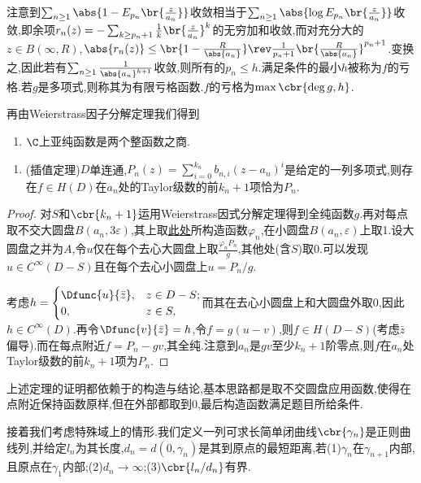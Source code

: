 \documentclass{article}
\begin{document}
注意到$\sum_{n\geq 1}\abs{1-E_{p_n}\br{\frac{z}{a_n}}}$收敛相当于$\sum_{n\geq 1}\abs{\log E_{p_n}\br{\frac{z}{a_n}}}$收敛,即余项$r_n(z)=-\sum_{k\geq p_n+1}\frac{1}{k}\br{\frac{z}{a_n}}^k$的无穷加和收敛,而对充分大的$z\in B(\infty,R)$,$\abs{r_n(z)}\leq \br{1-\frac{R}{\abs{a_n}}}\rev\frac{1}{p_n+1}\br{\frac{R}{\abs{a_n}}}^{p_n+1}$.变换之,因此若有$\sum_{n\geq 1}\frac{1}{\abs{a_n}^{h+1}}$收敛,则所有的$p_n\leq h$.满足条件的最小$h$被称为$f$的亏格.若$g$是多项式,则称其为有限亏格函数.$f$的亏格为$\max\cbr{\deg g,h}$.

再由Weierstrass因子分解定理我们得到
\begin{enumerate}[resume]
    \item $\C$上亚纯函数是两个整函数之商.\\
\end{enumerate}

\begin{enumerate}[resume]
    \item (插值定理)$D$单连通,$P_n(z)=\sum_{i=0}^{k_n}b_{n,i}(z-a_n)^i$是给定的一列多项式,则存在$f\in H(D)$在$a_n$处的Taylor级数的前$k_n+1$项恰为$P_n$.
\end{enumerate}
\begin{proof}
    对$S$和$\cbr{k_n+1}$运用Weierstrass因式分解定理得到全纯函数$g$.再对每点取不交大圆盘$B(a_n,3\varepsilon)$,其上取\hyperlink{dbar-func}{此处}所构造函数$\varphi_n$,在小圆盘$B(a_n,\varepsilon)$上取1.设大圆盘之并为$A$,令$u$仅在每个去心大圆盘上取$\frac{\varphi_n P_n}{g}$,其他处(含$S$)取0.可以发现$u\in C^\infty(D-S)$且在每个去心小圆盘上$u=P_n/g$.
    
    \dayhrule

    考虑$h=\begin{cases}
        \Dfunc{u}{\bar{z}},&z\in D-S;\\0,&z\in S,
    \end{cases}$而其在去心小圆盘上和大圆盘外取0,因此$h\in C^\infty(D)$.再令$\Dfunc{v}{\bar{z}}=h$,令$f=g(u-v)$,则$f\in H(D-S)$(考虑$\bar{z}$偏导).而在每点附近$f=P_n-gv$,其全纯.注意到$a_n$是$gv$至少$k_n+1$阶零点,则$f$在$a_n$处Taylor级数的前$k_n+1$项为$P_n$.
\end{proof}

上述定理的证明都依赖于的构造与结论,基本思路都是取不交圆盘应用函数,使得在点附近保持函数原样,但在外部都取到0,最后构造函数满足题目所给条件.

接着我们考虑特殊域上的情形.我们定义一列可求长简单闭曲线$\cbr{\gamma_n}$是正则曲线列,并给定$l_n$为其长度,$d_n=d(0,\gamma_n)$是其到原点的最短距离,若(1)$\gamma_n$在$\gamma_{n+1}$内部,且原点在$\gamma_1$内部;(2)$d_n\to\infty$;(3)$\cbr{l_n/d_n}$有界.
\end{document}
